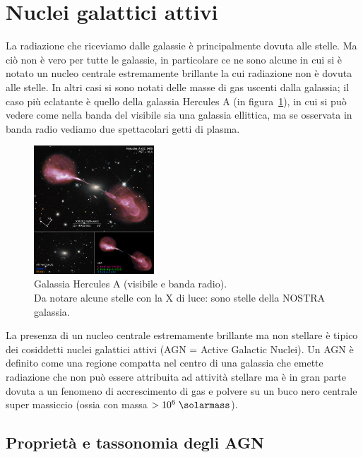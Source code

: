 \section{Nuclei galattici attivi} \label{sec:nuclei-galattici-attivi}
La radiazione che riceviamo dalle galassie è principalmente dovuta alle stelle. Ma ciò non è vero per tutte le galassie, in particolare ce ne sono alcune in cui si è notato un nucleo centrale estremamente brillante la cui radiazione non è dovuta alle stelle. In altri casi si sono notati delle masse di gas uscenti dalla galassia; il caso più eclatante è quello della galassia Hercules A (in figura~\ref{fig:hercules-a}), in cui si può vedere come nella banda del visibile sia una galassia ellittica, ma se osservata in banda radio vediamo due spettacolari getti di plasma.

\begin{figure}
    \centering
    \includegraphics[width = 0.4\textwidth]{immagini/hercules-a.png}
    \caption{Galassia Hercules A (visibile e banda radio). \\ Da notare alcune stelle con la X di luce: sono stelle della NOSTRA galassia.}
    \label{fig:hercules-a}
\end{figure}

La presenza di un nucleo centrale estremamente brillante ma non stellare è tipico dei cosiddetti nuclei galattici attivi (AGN = Active Galactic Nuclei). Un AGN è definito come una regione compatta nel centro di una galassia che emette radiazione che non può essere attribuita ad attività stellare ma è in gran parte dovuta a un fenomeno di accrescimento di gas e polvere su un buco nero centrale super massiccio (ossia con massa $> 10^6 \;\si{\solarmass}$). 

\subsection{Proprietà e tassonomia degli AGN}

